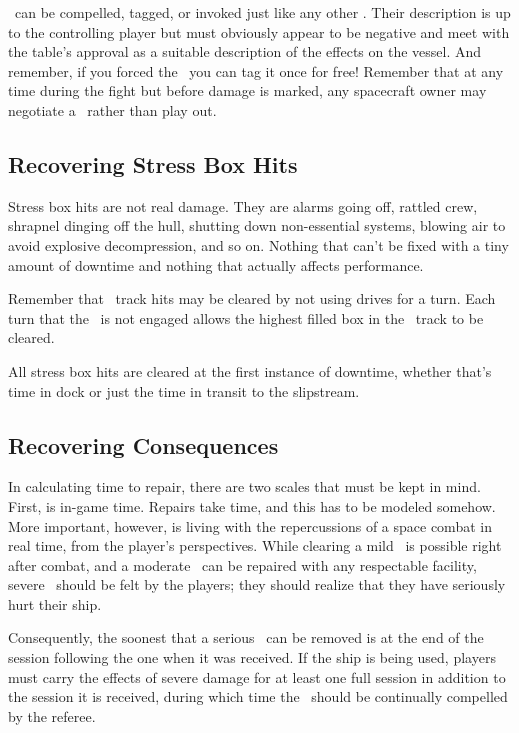 \Consequences\ can be compelled, tagged, or invoked just like any other \Aspect. Their description is up to the controlling player but must obviously appear to be negative and meet with the table's approval as a suitable description of the effects on the vessel. And remember, if you forced the \Consequence\ you can tag it once for free! Remember that at any time during the fight but before damage is marked, any spacecraft owner may negotiate a \Concession\ rather than play out.

\subsection{Recovering Stress Box Hits}
\label{sec:Recovering Stress Box Hits}

Stress box hits are not real damage. They are alarms going off, rattled crew, shrapnel dinging off the hull, shutting down non-essential systems, blowing air to avoid explosive decompression, and so on. Nothing that can't be fixed with a tiny amount of downtime and nothing that actually affects performance.

Remember that \Heat\ track hits may be cleared by not using drives for a turn. Each turn that the \Vshift\ is not engaged allows the highest filled box in the \Heat\ track to be cleared.

All stress box hits are cleared at the first instance of downtime, whether that's time in dock or just the time in transit to the slipstream.

\subsection{Recovering Consequences}
\label{sec:Recovering Consequences}

In calculating time to repair, there are two scales that must be kept in mind. First, is in-game time. Repairs take time, and this has to be modeled somehow. More important, however, is living with the repercussions of a space combat in real time, from the player's perspectives. While clearing a mild \Consequence\ is possible right after combat, and a moderate \Consequence\ can be repaired with any respectable facility, severe \Consequences\ should be felt by the players; they should realize that they have seriously hurt their ship.

Consequently, the soonest that a serious \Consequence\ can be removed is at the end of the session following the one when it was received.  If the ship is being used, players must carry the effects of severe damage for at least one full session in addition to the session it is received, during which time the \Consequence\ should be continually compelled by the referee.

